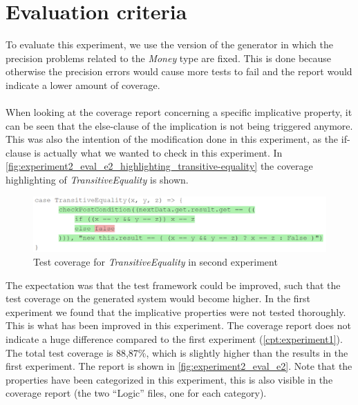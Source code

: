 \section{Evaluation criteria}
To evaluate this experiment, we use the version of the generator in which the precision problems related to the \textit{Money} type are fixed. This is done because otherwise the precision errors would cause more tests to fail and the report would indicate a lower amount of coverage.\\
\\
When looking at the coverage report concerning a specific implicative property,
it can be seen that the else-clause of the implication is not being triggered
anymore. This was also the intention of the modification done in this
experiment, as the if-clause is actually what we wanted to check in this
experiment. In
\autoref{fig:experiment2_eval_e2_highlighting_transitive-equality} the coverage
highlighting of \textit{TransitiveEquality} is shown.
\begin{figure}[!ht]
	\includegraphics[width=\linewidth]{figures/e2_coverage_implicative_property}
\caption{Test coverage for \textit{TransitiveEquality} in second experiment}
\label{fig:experiment2_eval_e2_highlighting_transitive-equality}
\centering
\end{figure}
\FloatBarrier\noindent
%
The expectation was that the test framework could be improved, such that the
test coverage on the generated system would become higher. In the first
experiment we found that the implicative properties were not tested thoroughly. This is what has been improved in this experiment. The coverage report does not indicate a huge difference compared to the first experiment (\autoref{cpt:experiment1}). The total test coverage is 88,87\%, which is slightly higher than the results in the first experiment. The report is shown in \autoref{fig:experiment2_eval_e2}. Note that the properties have been categorized in this experiment, this is also visible in the coverage report (the two ``Logic'' files, one for each category).
